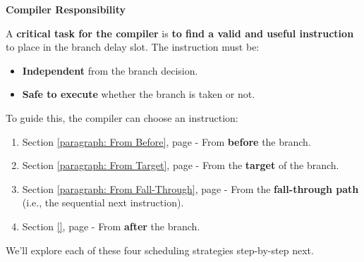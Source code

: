 \highspace
\begin{flushleft}
    \textcolor{Red2}{ \textbf{Compiler Responsibility}}
\end{flushleft}
A \textbf{critical task for the compiler} is \textbf{to find a valid and useful instruction} to place in the branch delay slot. The instruction must be:
\begin{itemize}
    \item \textbf{Independent} from the branch decision.
    \item \textbf{Safe to execute} whether the branch is taken or not.
\end{itemize}
To guide this, the compiler can choose an instruction:
\begin{enumerate}
    \item Section \ref{paragraph: From Before}, page \pageref{paragraph: From Before} - From \textbf{before} the branch.
    \item Section \ref{paragraph: From Target}, page \pageref{paragraph: From Target} - From the \textbf{target} of the branch.
    \item Section \ref{paragraph: From Fall-Through}, page \pageref{paragraph: From Fall-Through} - From the \textbf{fall-through path} (i.e., the sequential next instruction).
    \item Section \ref{}, page \pageref{} - From \textbf{after} the branch.
\end{enumerate}
We'll explore each of these four scheduling strategies step-by-step next.